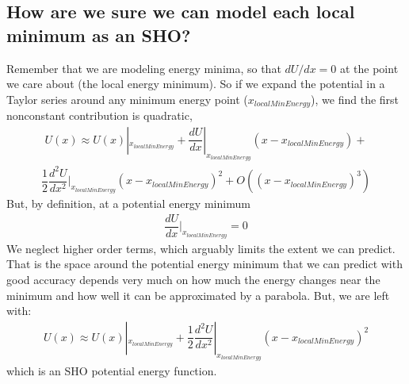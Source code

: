 \documentclass[letterpaper,10pt,english]{jupyterBook}
\begin{document}
\subsection{How are we sure we can model each local minimum as an SHO?}
\label{\detokenize{content/2_oscillations/readings-oscillators:how-are-we-sure-we-can-model-each-local-minimum-as-an-sho}}
\sphinxAtStartPar
Remember that we are modeling energy minima, so that \(dU/dx=0\) at the point we care about (the local energy minimum). So if we expand the potential in a Taylor series around any minimum energy point (\(x_{localMinEnergy}\)), we find the first non\sphinxhyphen{}constant contribution is quadratic,
\begin{equation*}
\begin{split}U(x) \approx U(x)|_{x_{localMinEnergy}} + \dfrac{dU}{dx}|_{x_{localMinEnergy}}(x-x_{localMinEnergy}) +\end{split}
\end{equation*}\begin{equation*}
\begin{split}\dfrac{1}{2}\dfrac{d^2U}{dx^2}|_{x_{localMinEnergy}}(x-x_{localMinEnergy})^2 + O((x-x_{localMinEnergy})^3)\end{split}
\end{equation*}
\sphinxAtStartPar
But, by definition, at a potential energy minimum
\begin{equation*}
\begin{split}\dfrac{dU}{dx}|_{x_{localMinEnergy}}=0\end{split}
\end{equation*}
\sphinxAtStartPar
We neglect higher order terms, which arguably limits the extent we can predict. That is the space around the potential energy minimum that we can predict with good accuracy depends very much on how much the energy changes near the minimum and how well it can be approximated by a parabola. But, we are left with:
\begin{equation*}
\begin{split}U(x) \approx U(x)|_{x_{localMinEnergy}} + \dfrac{1}{2}\dfrac{d^2U}{dx^2}|_{x_{localMinEnergy}}(x-x_{localMinEnergy})^2\end{split}
\end{equation*}
\sphinxAtStartPar
which is an SHO potential energy function.
\end{document}
